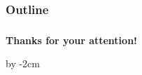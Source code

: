 \documentclass[aspectratio=1610,10pt]{beamer} %
\begin{document}

\maketitle

\begin{frame}
  \frametitle{Outline}
  \tableofcontents
\end{frame}











\begin{frame}[c]\frametitle{}
	\centering
	\Huge \textcolor{UFGblue}{\textbf{Thanks for your attention!}}
\end{frame}



\topskip=2cm\advance\textheight by -2cm\enlargethispage{-1cm}


\printbibliography


\end{document}
